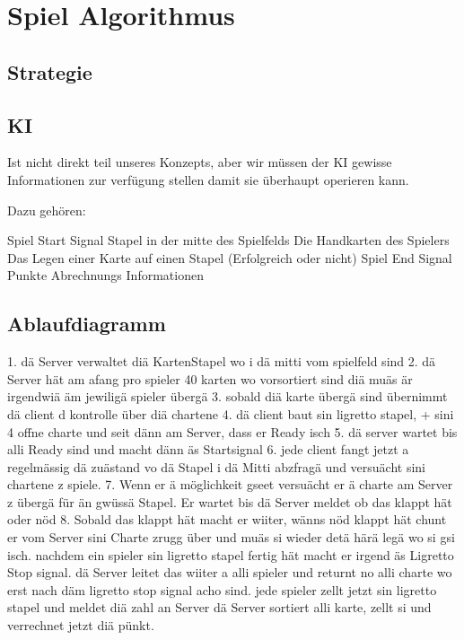 \section{Spiel Algorithmus} 

\subsection{Strategie}

\subsection{KI}

Ist nicht direkt teil unseres Konzepts, aber wir müssen der KI gewisse Informationen zur verfügung stellen damit sie überhaupt operieren kann.

Dazu gehören:

Spiel Start Signal
Stapel in der mitte des Spielfelds
Die Handkarten des Spielers
Das Legen einer Karte auf einen Stapel (Erfolgreich oder nicht)
Spiel End Signal
Punkte Abrechnungs Informationen

\subsection{Ablaufdiagramm}

1. dä Server verwaltet diä KartenStapel wo i dä mitti vom spielfeld sind
			2. dä Server hät am afang pro spieler 40 karten wo vorsortiert sind diä muäs är irgendwiä äm jewiligä spieler übergä
			3. sobald diä karte übergä sind übernimmt dä client d kontrolle über diä chartene
			4. dä client baut sin ligretto stapel, + sini 4 offne charte und seit dänn am Server, dass er Ready isch
			5. dä server wartet bis alli Ready sind und macht dänn äs Startsignal
			6. jede client fangt jetzt a regelmässig dä zuästand vo dä Stapel i dä Mitti abzfragä und versuächt sini chartene z spiele.
			7. Wenn er ä möglichkeit gseet versuächt er ä charte am Server z übergä für än gwüssä Stapel. Er wartet bis dä Server meldet ob das klappt hät oder nöd
			8. Sobald das klappt hät macht er wiiter, wänns nöd klappt hät chunt er vom Server sini Charte zrugg über und muäs si wieder detä härä legä wo si gsi isch.
			nachdem ein spieler sin ligretto stapel fertig hät macht er irgend äs Ligretto Stop signal. dä Server leitet das wiiter a alli spieler und returnt no alli charte wo erst nach däm ligretto stop signal acho sind.
			jede spieler zellt jetzt sin ligretto stapel und meldet diä zahl an Server
			dä Server sortiert alli karte, zellt si und verrechnet jetzt diä pünkt.